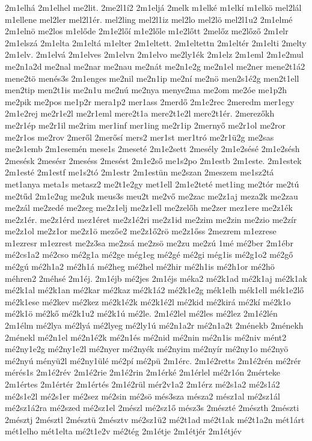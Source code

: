 {2m1elhá
2m1elhel
me2lit.
2me2l1í2
2m1eljá
2melk
m1elké
m1elkí
m1elkö
mel2lál
m1ellene
mel2ler
mel2l1ér.
mel2ling
mel2l1iz
mel2lo
mel2lö
mel2l1u2
2m1elmé
2m1elnö
me2los
m1előde
2m1e2lőí
m1e2lőle
m1e2lőtt
2melőz
me2lőző
2m1elr
2m1elszá
2m1elta
2m1eltá
m1elter
2m1eltett.
2m1eltettn
2m1eltér
2m1elti
2melty
2m1elv.
2m1elvá
2m1elves
2m1elvn
2m1elvo
me2ly1ék
2m1elz
2m1eml
2m1e2mul
me2n1a2d
me2nal
me2nar
me2nau
me2nát
me2n1e2g
me2n1el
me2ner
mene2t1á2
mene2tö
menés3s
2m1enges
me2nil
me2n1ip
me2ní
me2nö
men2s1é2g
men2t1ell
men2tip
men2t1is
me2n1u
me2nú
me2nya
menye2ma
me2om
me2óe
me1p2h
me2pik
me2pos
me1p2r
mera1p2
mer1ass
2merdő
2m1e2rec
2meredm
mer1egy
2m1e2rej
me2r1e2l
me2r1eml
mere2t1a
mere2t1e2l
mere2t1ér.
2merezőkh
me2r1ép
me2r1il
me2rim
mer1inf
mer1ing
me2r1ip
2mernyő
me2r1ol
me2ror
me2r1os
me2rov
2meről
2merősí
mers2
mer1st
mer1tró
me2r1ü2g
me2sas
me2s1emb
2m1esemén
mese1s
2meseté
2m1e2sett
2mesély
2m1e2sésé
2m1e2sésh
2mesésk
2mesésr
2meséss
2mesést
2m1e2ső
me1s2po
2m1estb
2m1este.
2m1estek
2m1esté
2m1estf
me1s2tó
2m1estr
2m1estün
me2szan
2meszem
me1sz2tá
met1anya
meta1s
metasz2
me2t1e2gy
met1ell
2m1e2teté
met1ing
me2tór
me2tú
me2tűd
2m1e2ug
me2uk
meus3s
meu2t
me2vő
me2zac
me2z1aj
meza2k
me2zau
me2zál
me2zedé
me2zeg
me2z1elj
me2z1ell
me2zelőh
me2zer
mez1ere
me2z1ék
me2z1ér.
me2z1érd
mez1éret
me2z1é2ri
me2z1id
me2zim
me2zin
me2zio
me2zír
me2z1ol
me2z1or
me2z1ö
mezőe2
me2z1ő2rö
me2z1őss
2mezrem
m1ezrese
m1ezresr
m1ezrest
me2z3sa
me2zsá
me2zsö
me2zu
me2zú
1mé
mé2ber
2m1ébr
mé2cs1a2
mé2cso
mé2g1a
mé2ge
még1eg
mé2gé
mé2gi
még1is
mé2g1o2
mé2gő
mé2gú
mé2h1a2
mé2h1á
mé2heg
mé2hel
mé2hir
mé2h1is
mé2h1or
mé2hö
méhren2
2méhsé
2m1éj.
2m1éjb
mé2jes
2m1éjs
méka2
mé2k1ad
mé2k1aj
mé2k1ak
mé2k1al
mé2k1an
mé2kar
mé2kaz
mé2k1á2
mé2k1e2g
mék1elh
mék1ell
mék1e2lő
mé2k1ese
mé2kev
mé2kez
mé2k1é2k
mé2k1é2l
mé2kid
mé2kirá
mé2kí
mé2k1o
mé2k1ö
mé2kő
mé2k1u2
mé2k1ú
mé2le.
2m1é2lel
mé2les
mé2lez
2m1é2lén
2m1élm
mé2lya
mé2lyá
mé2lyeg
mé2ly1ú
mé2n1a2r
mé2n1a2t
2ménekb
2ménekh
2ménekl
mé2n1el
mé2n1é2k
mé2n1és
mé2nid
mé2nin
mé2n1is
mé2niv
mént2
mé2ny1e2g
mé2ny1e2l
mé2nyer
mé2nyék
mé2nyim
mé2nyír
mé2ny1o
mé2nyö
mé2nyú
ményü2l
mé2ny1ülé
mé2pí
mé2pü
2m1érc.
2m1é2retts
2m1é2rén
mé2rér
mérés1s
2m1é2rév
2m1é2rie
2m1é2rin
2m1érké
2m1érlel
mé2r1ón
2mérteke
2m1értes
2m1értér
2m1értés
2m1é2rül
mér2v1a2
2m1érz
mé2s1a2
mé2s1á2
mé2s1e2l
mé2s1er
mé2sez
mé2sin
mé2sö
més3sza
mésza2
mész1al
mé2sz1ál
mé2sz1á2ra
mé2szed
mé2sz1el
2mészl
mé2sz1ő
mész3s
2mészté
2mészth
2mészti
2mésztj
2mésztl
2mésztü
2mésztv
mé2sz1ü2
mé2t1ad
mé2t1ak
mé2t1a2n
mét1árt
mét1elho
mét1elta
mé2t1e2v
mé2tég
2m1étje
2m1étjér
2m1étjév
}
